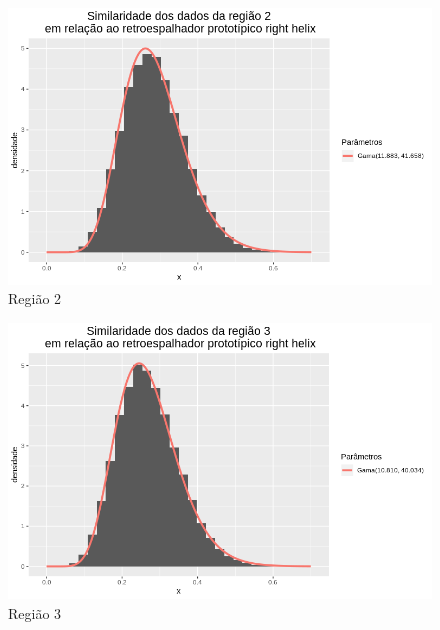 \documentclass[12pt]{article}
\begin{document}
\begin{figure}[!h]
    \centering
    \includegraphics[width = \linewidth]{../../Images/Report_18_12_20/rh_region2.png}
    \caption{Região 2}
    \label{fig:rh_r2}
\end{figure}

\begin{figure}[!h]
    \centering
    \vspace{0.1\linewidth}
    \includegraphics[width = \linewidth]{../../Images/Report_18_12_20/rh_region3.png}
    \caption{Região 3}
    \label{fig:rh_r3}
\end{figure}
\end{document}
